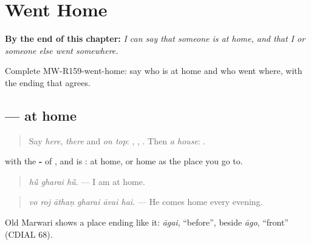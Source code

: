 
\chapter{Went Home}
\label{ch:mw-a2-went-home}

\begin{chapteropening}
\textbf{By the end of this chapter:} \emph{I can say that someone is at home, and that I or someone else went somewhere.}

Complete MW-R159-went-home: say who is at home and who went where, with the ending that agrees.
\end{chapteropening}

\section[\texorpdfstring{\mw{घरै} (gharai)}{घरै (gharai)}]{ — at home}

\label{lesson:MW-C159-gharai}



\begin{quote}
Say \emph{here}, \emph{there} and \emph{on top}: \textbf{}, \textbf{}, \textbf{}. Then \emph{a house}: \textbf{}.
\end{quote}

\begin{grammarlens}[title={Grammar Lens: \mw{घर} with -\mw{ै}}]
\textbf{} with the \textbf{-} of \textbf{}, \textbf{} and \textbf{} is \textbf{}: at home, or home as the place you go to.

\begin{quote}
\textbf{  }
\end{quote}

\begin{quote}
\emph{hū̃ gharai hū̃.} — I am at home.
\end{quote}

\begin{quote}
\textbf{     }
\end{quote}

\begin{quote}
\emph{vo roj āthaṇ gharai āvai hai.} — He comes home every evening.
\end{quote}

Old Marwari shows a place ending like it: \emph{āgai}, \textquotedblleft{}before\textquotedblright{}, beside \emph{āgo}, \textquotedblleft{}front\textquotedblright{} (CDIAL 68).
\end{grammarlens}

